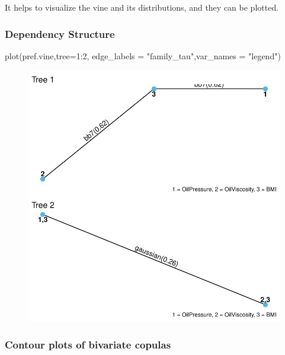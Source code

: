 \documentclass[
  letterpaper,
  DIV=11,
  numbers=noendperiod]{scrartcl}
\newenvironment{Shaded}{\begin{snugshade}}{\end{snugshade}}
\newcommand{\AttributeTok}[1]{\textcolor[rgb]{0.40,0.45,0.13}{#1}}
\newcommand{\DecValTok}[1]{\textcolor[rgb]{0.68,0.00,0.00}{#1}}
\newcommand{\FunctionTok}[1]{\textcolor[rgb]{0.28,0.35,0.67}{#1}}
\newcommand{\NormalTok}[1]{\textcolor[rgb]{0.00,0.23,0.31}{#1}}
\newcommand{\SpecialCharTok}[1]{\textcolor[rgb]{0.37,0.37,0.37}{#1}}
\newcommand{\StringTok}[1]{\textcolor[rgb]{0.13,0.47,0.30}{#1}}
\begin{document}
It helps to visualize the vine and its distributions, and they can be
plotted.

\hypertarget{dependency-structure}{%
\subsubsection{Dependency Structure}\label{dependency-structure}}

\begin{Shaded}
\begin{Highlighting}[]
\FunctionTok{plot}\NormalTok{(pref.vine,}\AttributeTok{tree=}\DecValTok{1}\SpecialCharTok{:}\DecValTok{2}\NormalTok{, }\AttributeTok{edge\_labels =} \StringTok{"family\_tau"}\NormalTok{,}\AttributeTok{var\_names =} \StringTok{"legend"}\NormalTok{)}
\end{Highlighting}
\end{Shaded}

\begin{figure}[H]

{\centering \includegraphics{MakingData_files/figure-pdf/unnamed-chunk-5-1.pdf}

}

\end{figure}

\hypertarget{contour-plots-of-bivariate-copulas}{%
\subsubsection{Contour plots of bivariate
copulas}\label{contour-plots-of-bivariate-copulas}}
\end{document}
